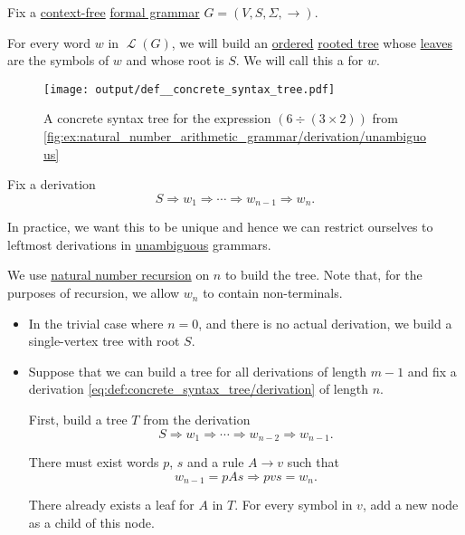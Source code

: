 \begin{definition}\label{def:concrete_syntax_tree}\mimprovised
  Fix a \hyperref[def:chomsky_hierarchy/context_free]{context-free} \hyperref[def:formal_grammar]{formal grammar} \( G = (V, S, \Sigma, \to) \).

  For every word \( w \) in \( \mscrL(G) \), we will build an \hyperref[def:ordered_arborescence]{ordered} \hyperref[def:arborescence/undirected]{rooted tree} whose \hyperref[def:arborescence/ancestry]{leaves} are the symbols of \( w \) and whose root is \( S \). We will call this a  for \( w \).

  \begin{figure}[!ht]
    \hfill
    \texttt{[image: output/def\_\_concrete\_syntax\_tree.pdf]}
    \hfill\hfill
    \caption{A concrete syntax tree for the expression \( (6 \div (3 \times 2)) \) from \cref{fig:ex:natural_number_arithmetic_grammar/derivation/unambiguous}}
    \label{fig:def:concrete_syntax_tree}
  \end{figure}

  Fix a derivation
  \begin{equation}\label{eq:def:concrete_syntax_tree/derivation}
    S \Rightarrow w_1 \Rightarrow \cdots \Rightarrow w_{n-1} \Rightarrow w_n.
  \end{equation}

  In practice, we want this to be unique and hence we can restrict ourselves to leftmost derivations in \hyperref[def:grammar_derivation/unambiguous]{unambiguous} grammars.

  We use \hyperref[rem:natural_number_recursion]{natural number recursion} on \( n \) to build the tree. Note that, for the purposes of recursion, we allow \( w_n \) to contain non-terminals.

  \begin{itemize}
    \item In the trivial case where \( n = 0 \), and there is no actual derivation, we build a single-vertex tree with root \( S \).

    \item Suppose that we can build a tree for all derivations of length \( m - 1 \) and fix a derivation \eqref{eq:def:concrete_syntax_tree/derivation} of length \( n \).

    First, build a tree \( T \) from the derivation
    \begin{equation*}
      S \Rightarrow w_1 \Rightarrow \cdots \Rightarrow w_{n-2} \Rightarrow w_{n-1}.
    \end{equation*}

    There must exist words \( p \), \( s \) and a rule \( A \to v \) such that
    \begin{equation*}
      w_{n-1} = pAs \Rightarrow pvs = w_n.
    \end{equation*}

    There already exists a leaf for \( A \) in \( T \). For every symbol in \( v \), add a new node as a child of this node.
  \end{itemize}
\end{definition}

